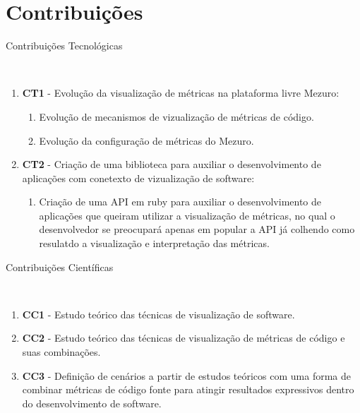 \section{Contribuições}
%
\begin{description}
  \item [Contribuições Tecnológicas]\
\end{description}
    \begin{enumerate}
      \item \textbf{CT1} - Evolução da visualização de métricas na
      plataforma livre Mezuro:
        \begin{enumerate}
          \item Evolução de mecanismos de vizualização de métricas de código.
          \item Evolução da configuração de métricas do Mezuro.
        \end{enumerate}
      \item \textbf{CT2} - Criação de uma biblioteca para auxiliar o desenvolvimento
      de aplicações com conetexto de vizualização de software:
            \begin{enumerate}
              \item  Criação de uma API em ruby para auxiliar o desenvolvimento
              de aplicações que queiram utilizar a visualização de métricas, no qual
              o desenvolvedor se preocupará apenas em popular a API já colhendo
              como resulatdo a visualização e interpretação das métricas.
            \end{enumerate}
    \end{enumerate}
\begin{description}
  \item [Contribuições Científicas]\
\end{description}
     \begin{enumerate}
      \item \textbf{CC1} - Estudo teórico das técnicas de visualização de software.
      \item \textbf{CC2} - Estudo teórico das técnicas de visualização de métricas de código
      e suas combinações.
      \item \textbf{CC3} - Definição de cenários a partir de estudos teóricos
       com uma forma de combinar métricas de código fonte para atingir resultados
       expressivos dentro do desenvolvimento de software.
     \end{enumerate}
